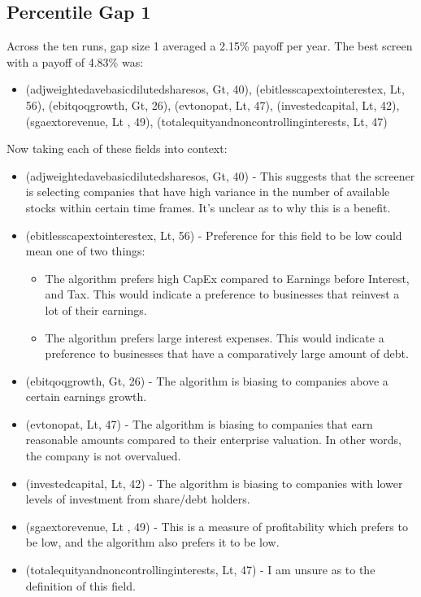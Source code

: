 \subsection{Percentile Gap 1}
Across the ten runs, gap size 1 averaged a 2.15\% payoff per year. The best screen with a payoff of 4.83\% was:

\begin{itemize}
    \item (adjweightedavebasicdilutedsharesos, Gt, 40), \newline (ebitlesscapextointerestex, Lt, 56), (ebitqoqgrowth, Gt, 26), \newline (evtonopat, Lt, 47), (investedcapital, Lt, 42), (sgaextorevenue, Lt , 49), \newline (totalequityandnoncontrollinginterests, Lt, 47)
\end{itemize}

Now taking each of these fields into context:
\begin{itemize}
    \item (adjweightedavebasicdilutedsharesos, Gt, 40) - This suggests that the screener is selecting companies that have high variance in the number of available stocks within certain time frames. It's unclear as to why this is a benefit.
    \item (ebitlesscapextointerestex, Lt, 56) - Preference for this field to be low could mean one of two things:
    \begin{itemize}
        \item The algorithm prefers high CapEx compared to Earnings before Interest, and Tax. This would indicate a preference to businesses that reinvest a lot of their earnings.
        \item The algorithm prefers large interest expenses. This would indicate a preference to businesses that have a comparatively large amount of debt.
    \end{itemize}
    \item (ebitqoqgrowth, Gt, 26) - The algorithm is biasing to companies above a certain earnings growth.
    \item (evtonopat, Lt, 47) - The algorithm is biasing to companies that earn reasonable amounts compared to their enterprise valuation. In other words, the company is not overvalued.
    \item (investedcapital, Lt, 42) - The algorithm is biasing to companies with lower levels of investment from share/debt holders.
    \item (sgaextorevenue, Lt , 49) - This is a measure of profitability which prefers to be low, and the algorithm also prefers it to be low.
    \item (totalequityandnoncontrollinginterests, Lt, 47) - I am unsure as to the definition of this field.
\end{itemize}

